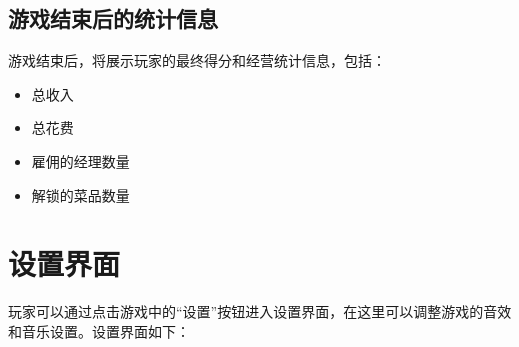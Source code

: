 \documentclass{mancls}%
\begin{document}
\subsection{游戏结束后的统计信息}

游戏结束后，将展示玩家的最终得分和经营统计信息，包括：
\begin{itemize}
  \item 总收入
  \item 总花费
  \item 雇佣的经理数量
  \item 解锁的菜品数量
\end{itemize}

\pagebreak

\section{设置界面}

玩家可以通过点击游戏中的“设置”按钮进入设置界面，在这里可以调整游戏的音效和音乐设置。设置界面如下：
\end{document}
